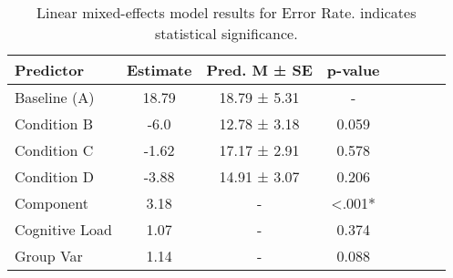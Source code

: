 
    \begin{table}[H]
    \centering
    \begin{small}
    \begin{tabular}{lccccccc}
\toprule
Predictor & Estimate & Pred. M ± SE & p-value \\
\midrule
Baseline (A) & 18.79 & 18.79 ± 5.31 & - \\
Condition B & -6.0 & 12.78 ± 3.18 & 0.059 \\
Condition C & -1.62 & 17.17 ± 2.91 & 0.578 \\
Condition D & -3.88 & 14.91 ± 3.07 & 0.206 \\
Component & 3.18 & - & <.001* \\
Cognitive Load & 1.07 & - & 0.374 \\
Group Var & 1.14 & - & 0.088 \\
\bottomrule
\end{tabular}

    \end{small}
    \caption[Linear mixed-effects model results for Error Rate]{Linear mixed-effects model results for Error Rate. \newline * indicates statistical significance.}
    \label{tab:errorrate}

    \end{table}